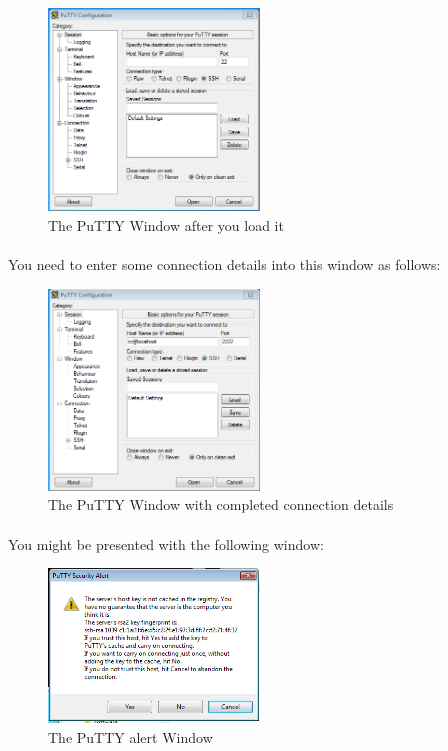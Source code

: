 \documentclass[12pt, a4paper, twoside]{book}
\begin{document}
\begin{figure}[H]
\centering
\includegraphics[width=0.5\textwidth]{images/putty_empty.png}
\caption{The PuTTY Window after you load it}
\label{fig:putty-empty}
\end{figure}

\paragraph{} You need to enter some connection details into this window as follows:

\begin{figure}[H]
\centering
\includegraphics[width=0.5\textwidth]{images/putty_complete.png}
\caption{The PuTTY Window with completed connection details}
\label{fig:putty-complete}
\end{figure}

\paragraph{} You might be presented with the following window:

\begin{figure}[H]
\centering
\includegraphics[width=0.5\textwidth]{images/putty_alert.png}
\caption{The PuTTY alert Window}
\label{fig:putty-alert}
\end{figure}
\end{document}
